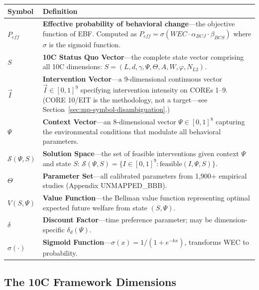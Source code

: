 \begin{longtable}{@{}p{2.8cm}p{10cm}@{}}
\toprule
\textbf{Symbol} & \textbf{Definition} \\
\midrule
\endhead
$P_{eff}$ & \textbf{Effective probability of behavioral change}---the objective function of EBF. Computed as $P_{eff} = \sigma(WEC \cdot \alpha_{BCJ} \cdot \beta_{BCS})$ where $\sigma$ is the sigmoid function. \\[6pt]
$S$ & \textbf{10C Status Quo Vector}---the complete state vector comprising all 10C dimensions: $S = (L, d, \gamma, \Psi, \Theta, A, W, \varphi, N_{L2})$. \\[6pt]
$\vec{I}$ & \textbf{Intervention Vector}---a 9-dimensional continuous vector $\vec{I} \in [0,1]^9$ specifying intervention intensity on COREs 1--9. (CORE 10/EIT is the methodology, not a target---see Section~\ref{sec:mp-symbol-disambiguation}.) \\[6pt]
$\Psi$ & \textbf{Context Vector}---an 8-dimensional vector $\Psi \in [0,1]^8$ capturing the environmental conditions that modulate all behavioral parameters. \\[6pt]
$\mathcal{S}(\Psi, S)$ & \textbf{Solution Space}---the set of feasible interventions given context $\Psi$ and state $S$: $\mathcal{S}(\Psi, S) = \{I \in [0,1]^9 : \text{feasible}(I, \Psi, S)\}$. \\[6pt]
$\Theta$ & \textbf{Parameter Set}---all calibrated parameters from 1,900+ empirical studies (Appendix UNMAPPED_BBB). \\[6pt]
$V(S, \Psi)$ & \textbf{Value Function}---the Bellman value function representing optimal expected future welfare from state $(S, \Psi)$. \\[6pt]
$\delta$ & \textbf{Discount Factor}---time preference parameter; may be dimension-specific $\delta_d(\Psi)$. \\[6pt]
$\sigma(\cdot)$ & \textbf{Sigmoid Function}---$\sigma(x) = 1/(1+e^{-kx})$, transforms WEC to probability. \\
\bottomrule
\end{longtable}

\subsection{The 10C Framework Dimensions}

